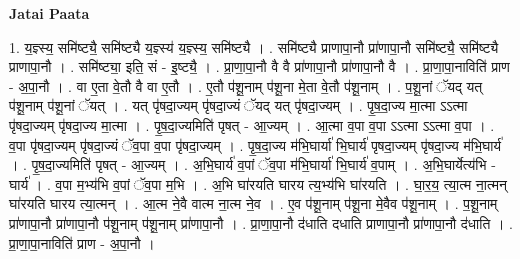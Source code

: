 \documentclass[17pt]{extarticle}
\begin{document}
\textbf{Jatai Paata} \newline

1. य॒ज्ञ्स्य॒ समि॑ष्ट्यै॒ समि॑ष्ट्यै य॒ज्ञ्स्य॑ य॒ज्ञ्स्य॒ समि॑ष्ट्यै । . समि॑ष्ट्यै प्राणापा॒नौ प्रा॑णापा॒नौ समि॑ष्ट्यै॒ समि॑ष्ट्यै प्राणापा॒नौ । . समि॑ष्ट्या॒ इति॒ सं - इ॒ष्ट्यै॒ । . प्रा॒णा॒पा॒नौ वै वै प्रा॑णापा॒नौ प्रा॑णापा॒नौ वै । . प्रा॒णा॒पा॒नाविति॑ प्राण - अ॒पा॒नौ । . वा ए॒ता वे॒तौ वै वा ए॒तौ । . ए॒तौ प॑शू॒नाम् प॑शू॒ना मे॒ता वे॒तौ प॑शू॒नाम् । . प॒शू॒नां ॅयद् यत् प॑शू॒नाम् प॑शू॒नां ॅयत् । . यत् पृ॑षदा॒ज्यम् पृ॑षदा॒ज्यं ॅयद् यत् पृ॑षदा॒ज्यम् । . पृ॒ष॒दा॒ज्य मा॒त्मा ऽऽत्मा पृ॑षदा॒ज्यम् पृ॑षदा॒ज्य मा॒त्मा । . पृ॒ष॒दा॒ज्यमिति॑ पृषत् - आ॒ज्यम् । . आ॒त्मा व॒पा व॒पा ऽऽत्मा ऽऽत्मा व॒पा । . व॒पा पृ॑षदा॒ज्यम् पृ॑षदा॒ज्यं ॅव॒पा व॒पा पृ॑षदा॒ज्यम् । . पृ॒ष॒दा॒ज्य म॑भि॒घार्या॑ भि॒घार्य॑ पृषदा॒ज्यम् पृ॑षदा॒ज्य म॑भि॒घार्य॑ । . पृ॒ष॒दा॒ज्यमिति॑ पृषत् - आ॒ज्यम् । . अ॒भि॒घार्य॑ व॒पां ॅव॒पा म॑भि॒घार्या॑ भि॒घार्य॑ व॒पाम् । . अ॒भि॒घार्येत्य॑भि - घार्य॑ । . व॒पा म॒भ्य॑भि व॒पां ॅव॒पा म॒भि । . अ॒भि घा॑रयति घारय त्य॒भ्य॑भि घा॑रयति । . घा॒र॒य॒ त्या॒त्म ना॒त्मन् घा॑रयति घारय त्या॒त्मन् । . आ॒त्म ने॒वै वात्म ना॒त्म ने॒व । . ए॒व प॑शू॒नाम् प॑शू॒ना मे॒वैव प॑शू॒नाम् । . प॒शू॒नाम् प्रा॑णापा॒नौ प्रा॑णापा॒नौ प॑शू॒नाम् प॑शू॒नाम् प्रा॑णापा॒नौ । . प्रा॒णा॒पा॒नौ द॑धाति दधाति प्राणापा॒नौ प्रा॑णापा॒नौ द॑धाति । . प्रा॒णा॒पा॒नाविति॑ प्राण - अ॒पा॒नौ । \newline
\end{document}
